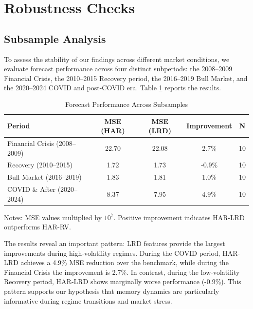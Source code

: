 \documentclass[12pt,a4paper]{article}
\begin{document}
\section{Robustness Checks}
\label{sec:robustness}

\subsection{Subsample Analysis}

To assess the stability of our findings across different market conditions, we evaluate forecast performance across four distinct subperiods: the 2008--2009 Financial Crisis, the 2010--2015 Recovery period, the 2016--2019 Bull Market, and the 2020--2024 COVID and post-COVID era. Table \ref{tab:subsamples} reports the results.

\begin{table}[htbp]
\centering
\caption{Forecast Performance Across Subsamples}
\label{tab:subsamples}
\small
\begin{tabular}{lcccc}
\toprule
Period & MSE (HAR) & MSE (LRD) & Improvement & N \\
\midrule
Financial Crisis (2008--2009) & 22.70 & 22.08 & 2.7\% & 10 \\
Recovery (2010--2015) & 1.72 & 1.73 & -0.9\% & 10 \\
Bull Market (2016--2019) & 1.83 & 1.81 & 1.0\% & 10 \\
COVID \& After (2020--2024) & 8.37 & 7.95 & 4.9\% & 10 \\
\bottomrule
\end{tabular}
\begin{tablenotes}\small
\item Notes: MSE values multiplied by $10^7$. Positive improvement indicates HAR-LRD outperforms HAR-RV.
\end{tablenotes}
\end{table}

The results reveal an important pattern: LRD features provide the largest improvements during high-volatility regimes. During the COVID period, HAR-LRD achieves a 4.9\% MSE reduction over the benchmark, while during the Financial Crisis the improvement is 2.7\%. In contrast, during the low-volatility Recovery period, HAR-LRD shows marginally worse performance (-0.9\%). This pattern supports our hypothesis that memory dynamics are particularly informative during regime transitions and market stress.
\end{document}
